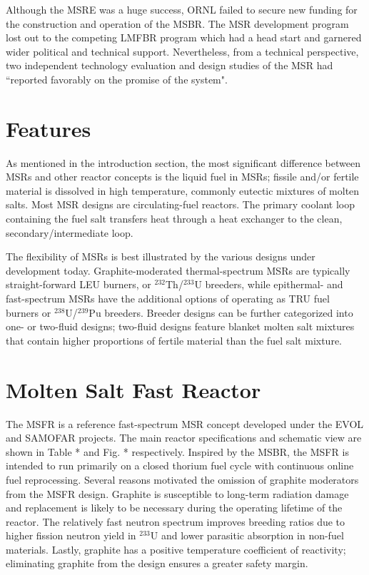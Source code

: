 Although the \gls{MSRE} was a huge success, \gls{ORNL} failed to secure new
funding for the construction and operation of the \gls{MSBR}. The \gls{MSR}
development program lost out to the competing \gls{LMFBR} program which had
a head start and garnered wider political and technical support.
Nevertheless, from a technical perspective, two independent technology
evaluation and design studies of the \gls{MSR} had ``reported favorably on
the promise of the system".

\section{Features}

As mentioned in the introduction section, the most significant difference
between \glspl{MSR} and other reactor
concepts is the liquid fuel in \glspl{MSR}; fissile and/or fertile material
is dissolved in
high temperature, commonly eutectic mixtures of molten salts. Most \gls{MSR}
designs are circulating-fuel reactors. The primary coolant loop containing
the fuel salt transfers heat through a heat exchanger to the clean,
secondary/intermediate loop.

The flexibility of \glspl{MSR} is best illustrated by the various designs
under development today. Graphite-moderated thermal-spectrum \glspl{MSR} are
typically straight-forward \gls{LEU} burners, or $^{232}$Th/$^{233}$U
breeders, while epithermal- and fast-spectrum \glspl{MSR} have the additional
options of operating as \gls{TRU} fuel burners or $^{238}$U/$^{239}$Pu
breeders. Breeder designs can be further categorized into one- or two-fluid
designs; two-fluid designs feature blanket molten salt mixtures that contain
higher proportions of fertile material than the fuel salt mixture.

\section{Molten Salt Fast Reactor}

The \gls{MSFR} is a reference fast-spectrum \gls{MSR} concept developed
under the \gls{EVOL} and \gls{SAMOFAR} projects. The main reactor
specifications and schematic view are shown in Table * and Fig. *
respectively. Inspired by the \gls{MSBR}, the \gls{MSFR} is
intended to run primarily on a closed thorium fuel cycle with
continuous online fuel reprocessing. Several reasons motivated the omission of
graphite moderators from the \gls{MSFR} design. Graphite is susceptible to
long-term radiation damage and replacement is likely to be necessary during
the operating lifetime of the reactor. The relatively fast neutron spectrum
improves breeding ratios due to higher fission neutron yield in $^{233}$U and
lower parasitic absorption in non-fuel materials. Lastly, graphite has a
positive temperature coefficient of reactivity; eliminating graphite from the
design ensures a greater safety margin.

